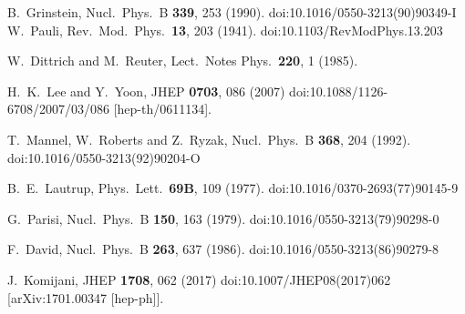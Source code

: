 \begin{thebibliography}{99}
  B.~Grinstein,
  Nucl.\ Phys.\ B {\bf 339}, 253 (1990).
  doi:10.1016/0550-3213(90)90349-I
  W.~Pauli,
  Rev.\ Mod.\ Phys.\  {\bf 13}, 203 (1941).
  doi:10.1103/RevModPhys.13.203
  
  W.~Dittrich and M.~Reuter,
  Lect.\ Notes Phys.\  {\bf 220}, 1 (1985).
  
  
  H.~K.~Lee and Y.~Yoon,
  JHEP {\bf 0703}, 086 (2007)
  doi:10.1088/1126-6708/2007/03/086
  [hep-th/0611134].

  T.~Mannel, W.~Roberts and Z.~Ryzak,
  Nucl.\ Phys.\ B {\bf 368}, 204 (1992).
  doi:10.1016/0550-3213(92)90204-O
  
  B.~E.~Lautrup,
  Phys.\ Lett.\  {\bf 69B}, 109 (1977).
  doi:10.1016/0370-2693(77)90145-9
  
  G.~Parisi,
  Nucl.\ Phys.\ B {\bf 150}, 163 (1979).
  doi:10.1016/0550-3213(79)90298-0
  
  F.~David,
  Nucl.\ Phys.\ B {\bf 263}, 637 (1986).
  doi:10.1016/0550-3213(86)90279-8

  J.~Komijani,
  JHEP {\bf 1708}, 062 (2017)
  doi:10.1007/JHEP08(2017)062
  [arXiv:1701.00347 [hep-ph]].
  

\end{thebibliography}
